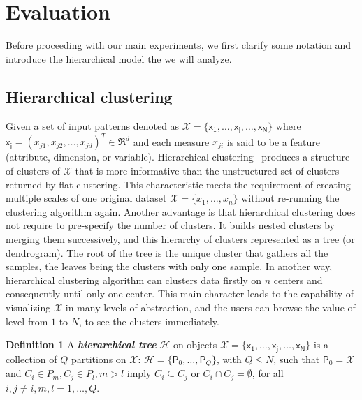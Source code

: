 \section{Evaluation}
\label{sec:evaluation}
Before proceeding with our main experiments, we first clarify some notation and introduce the hierarchical model the we will analyze. 
\subsection{Hierarchical clustering}
\label{subsec:hierarchical}
Given a set of input patterns denoted as $\mathcal{X} = \{\mathsf{x_1}, \ldots, \mathsf{x_j}, \ldots, \mathsf{x_N}\}$ where $\mathsf{x_j} = (x_{j1},x_{j2}, \ldots,x_{jd})^T \in \mathfrak{R}^d$ and each measure $x_{ji}$ is said to be a feature (attribute, dimension, or variable). Hierarchical clustering~\cite{johnson1967hierarchical} produces a structure of clusters of $\mathcal{X}$ that is more informative than the unstructured set of clusters returned by flat clustering. 
This characteristic meets the requirement of creating multiple scales of one original dataset $\mathcal{X}=\{x_1, \ldots, x_n\}$ 
without re-running the clustering algorithm again. Another advantage is that hierarchical clustering does not require to pre-specify the number of clusters. It builds nested clusters by merging them successively, and this hierarchy of clusters represented as a tree (or dendrogram). The root of the tree is the unique cluster that gathers all the samples, the leaves being the clusters with only one sample. In another way, hierarchical clustering algorithm %
can clusters data firstly on $n$ centers and consequently until only one center. This main character leads to the capability of visualizing $\mathcal{X}$ in many levels of abstraction, and the users can browse the value of level from $1$ to $N$, to see the clusters immediately.

\textbf{Definition 1} A \textit{\textbf{hierarchical tree}} $\mathcal{H}$ on objects $\mathcal{X}=\{\mathsf{x_1}, \ldots, \mathsf{x_j}, \ldots, \mathsf{x_N}\}$ is a collection of $Q$ partitions on $\mathcal{X}$: $\mathcal{H}=\{\mathsf{P}_0,\ldots,\mathsf{P}_Q\}$, with $Q \leq N$, such that $\mathsf{P}_0=\mathcal{X}$ and $C_{i} \in P_{m}, C_{j} \in P_{l}, m > l$ imply $C_{i} \subseteq C_{j}$ or $C_{i} \cap C_{j} = \emptyset$, for all $i,j \neq i, m, l = 1, \ldots, Q$.

